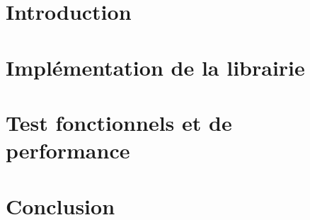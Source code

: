 \documentclass[a4paper
,oneside,11pt]{article}
\begin{document}
\section*{Introduction}\thispagestyle{fancy}



\section{Implémentation de la librairie}


\section{Test fonctionnels et de performance}



\section*{Conclusion}\thispagestyle{fancy}



%
\end{document}

